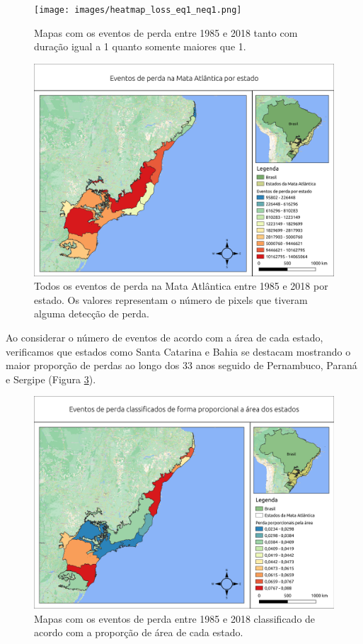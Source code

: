 \begin{figure}[H]
    \centering
    \texttt{[image: images/heatmap\_loss\_eq1\_neq1.png]}
    \caption{Mapas com os eventos de perda entre 1985 e 2018 tanto com duração igual a 1 quanto somente maiores que 1.}
    \label{fig:heat_loss_eq1_neq1}
\end{figure}

\begin{figure}[H]
    \centering
    \includegraphics[scale=.5]{images/estados_loss_masked85_maskedGain.png}
    \caption{Todos os eventos de perda na Mata Atlântica entre 1985 e 2018 por estado. Os valores representam o número de pixels que tiveram alguma detecção de perda.}
    \label{fig:estados_loss_masked85_maskedgain}
\end{figure}

Ao considerar o número de eventos de acordo com a área de cada estado, verificamos que estados como Santa Catarina e Bahia se destacam mostrando o maior proporção de perdas ao longo dos 33 anos seguido de Pernambuco, Paraná e Sergipe (Figura \ref{fig:estados_loss_proporcional}).

\begin{figure}[H]
    \centering
    \includegraphics[scale=.5]{images/estado_loss_proporcional.png}
    \caption{Mapas com os eventos de perda entre 1985 e 2018 classificado de acordo com a proporção de área de cada estado.}
    \label{fig:estados_loss_proporcional}
\end{figure}

